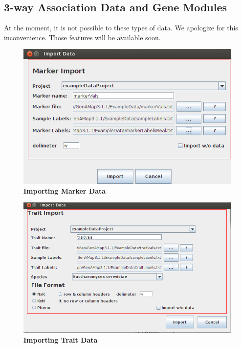 \documentclass{article}
\begin{document}
\subsection{3-way Association Data and Gene Modules}

At the moment, it is not possible to these types of data. We apologize for this inconvenience. Those features will be available soon.

\clearpage

\begin{figure}
\includegraphics[width=\textwidth]{Figure1.png}
\caption{\textbf{Importing Marker Data}}
\end{figure}

\begin{figure}
\includegraphics[width=\textwidth]{Figure2.png}
\caption{\textbf{Importing Trait Data}}
\end{figure}
\end{document}

